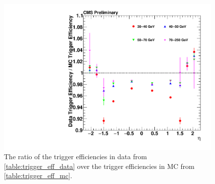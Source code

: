 \begin{figure}[!p]
    \centering
    \includegraphics[width=\textwidth]{figures/trigger_eff_ratio.pdf}
    \caption[
        The ratio of the trigger efficiencies.
    ]{
        The ratio of the trigger efficiencies in data from
        \cref{table:trigger_eff_data} over the trigger efficiencies in
        \MADGRAPH MC from \cref{table:trigger_eff_mc}.
    }
    \label{fig:trigger_eff_ratio}
\end{figure}
